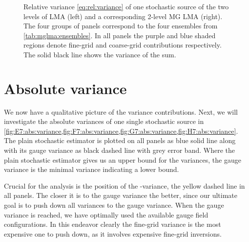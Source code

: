 \begin{figure}
\centering

\hfill
{}

\hfill
{}

\caption{Relative variance \cref{eq:rel:variance} of one stochastic source of the two levels of LMA (left) and a corresponding 2-level MG LMA (right). The four groups of panels correspond to the four ensembles from \cref{tab:mglma:ensembles}. In all panels the purple and blue shaded regions denote fine-grid and coarse-grid contributions respectively. The solid black line shows the variance of the sum.}
\label{fig:rel:variance}
\end{figure}

\section{Absolute variance}
\label{sec:numerics:abs:variance}

We now have a qualitative picture of the variance contributions.
Next, we will investigate the absolute variances of one single stochastic source in \cref{fig:E7:abs:variance,fig:F7:abs:variance,fig:G7:abs:variance,fig:H7:abs:variance}.
The plain stochastic estimator is plotted on all panels as blue solid line along with its gauge variance as black dashed line with grey error band.
Where the plain stochastic estimator gives us an upper bound for the variances, the gauge variance is the minimal variance indicating a lower bound.

Crucial for the analysis is the position of the -variance, the yellow dashed line in all panels.
The closer it is to the gauge variance the better, since our ultimate goal is to push down all variances to the gauge variance.
When the gauge variance is reached, we have optimally used the available gauge field configurations.
In this endeavor clearly the fine-grid variance is the most expensive one to push down, as it involves expensive fine-grid inversions.

